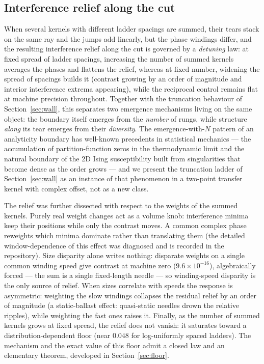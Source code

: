 \documentclass[11pt,a4paper]{article}
\begin{document}
\subsection{Interference relief along the cut}
\label{sec:relief}

When several kernels with
different ladder spacings are summed, their tears stack on the same ray
and the jumps add linearly, but the phase windings differ, and the
resulting interference relief along the cut is governed by a
\emph{detuning} law: at fixed spread of ladder spacings, increasing the
number of summed kernels averages the phases and flattens the relief,
whereas at fixed number, widening the spread of spacings builds it
(contrast growing by an order of magnitude and interior interference
extrema appearing), while the reciprocal control remains flat at
machine precision throughout. Together with the truncation behaviour of
Section~\ref{sec:wall}, this separates two emergence mechanisms living
on the same object: the boundary itself emerges from the \emph{number}
of rungs, while structure \emph{along} its tear emerges from their
\emph{diversity}. The emergence-with-$N$ pattern of an analyticity
boundary has well-known precedents in statistical mechanics --- the
accumulation of partition-function zeros in the thermodynamic limit
\cite{LeeYang1952} and the natural boundary of the 2D Ising
susceptibility built from singularities that become dense as the order
grows \cite{Nickel1999} --- and we present the truncation ladder of
Section~\ref{sec:wall} as an instance of that phenomenon in a
two-point transfer kernel with complex offset, not as a new class.

The relief was further dissected with respect to the weights of the
summed kernels. Purely real weight changes act as a volume knob:
interference minima keep their positions while only the contrast moves.
A common complex phase reweights which minima dominate rather than
translating them (the detailed window-dependence of this effect was
diagnosed and is recorded in the repository). Size disparity alone
writes nothing: disparate weights on a single common winding speed give
contrast at machine zero ($9.6\times10^{-16}$), algebraically forced ---
the sum is a single fixed-length needle --- so winding-speed disparity
is the only source of relief. When sizes correlate with speeds the
response is asymmetric: weighting the slow windings collapses the
residual relief by an order of magnitude (a static-ballast effect:
quasi-static needles drown the relative ripples), while weighting the
fast ones raises it. Finally, as the number of summed kernels grows at
fixed spread, the relief does not vanish: it saturates toward a
distribution-dependent floor (near $0.048$ for log-uniformly spaced
ladders). The mechanism and the exact value of this floor admit a
closed law and an elementary theorem, developed in
Section~\ref{sec:floor}.
\end{document}
